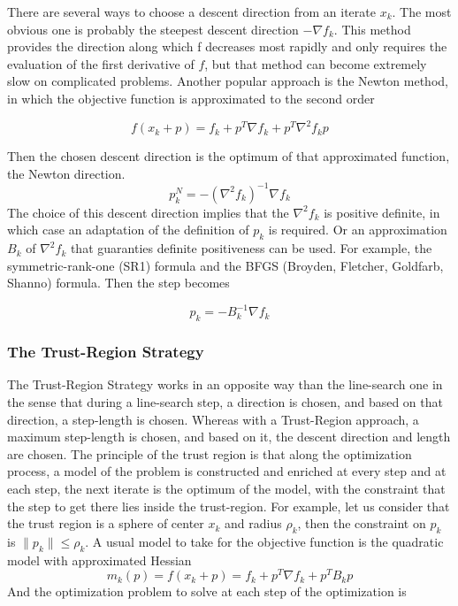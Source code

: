There are several ways to choose a descent direction from an iterate $x_k$. The
most obvious one is probably the steepest descent direction $-\nabla f_k$. This
method provides the direction along which f decreases most rapidly and only
requires the evaluation of the first derivative of $f$, but that method can
become extremely slow on complicated problems. Another popular approach is the
Newton method, in which the objective function is approximated to the second
order

\begin{equation}
  f(x_k+p) = f_k + p^T\nabla f_k + p^T\nabla^2f_k p
\end{equation}

Then the chosen descent direction is the optimum of that approximated function,
the Newton direction.
\begin{equation}
  p^N_k = -{(\nabla^2 f_k)}^{-1} \nabla f_k
\end{equation}
The choice of this descent direction implies that the $\nabla^2f_k$ is positive
definite, in which case an adaptation of the definition of $p_k$ is required. Or
an approximation $B_k$ of $\nabla^2f_k$ that guaranties definite positiveness can be
used. For example, the symmetric-rank-one (SR1) formula and the BFGS (Broyden,
Fletcher, Goldfarb, Shanno) formula. Then the step becomes

\begin{equation}
  p_k = -B_k^{-1}\nabla f_k
\end{equation}

\subsubsection{The Trust-Region Strategy}
\label{ssec:the_trust_region_strategy}
The Trust-Region Strategy works in an opposite way than the line-search one in
the sense that during a line-search step, a direction is chosen, and based on
that direction, a step-length is chosen. Whereas with a Trust-Region approach, a
maximum step-length is chosen, and based on it, the descent direction and length
are chosen.
The principle of the trust region is that along the optimization process, a
model of the problem is constructed and enriched at every step and at each step,
the next iterate is the optimum of the model, with the constraint that the step
to get there lies inside the trust-region. For example, let us consider that
the trust region is a sphere of center $x_k$ and radius $\rho_k$, then the
constraint on $p_k$ is $\|p_k\| \leq \rho_k$. A usual model to take for the
objective function is the quadratic model with approximated Hessian
\begin{equation}
  m_k(p) = f(x_k+p) = f_k + p^T \nabla f_k + p^T B_k p
\end{equation}
And the optimization problem to solve at each step of the optimization is

